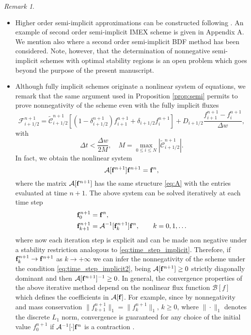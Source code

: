 \documentclass[a4paper]{article}
\theoremstyle{remark}\newtheorem{remark}{Remark}
\newcommand{\F}{\mathcal{F}}
\newcommand{\C}{\mathcal{C}}
\newcommand{\be}{\begin{equation}}
\newcommand{\ee}{\end{equation}}
\begin{document}
\begin{remark}~
\begin{itemize}
\item Higher order semi-implicit approximations can be constructed following {\rm \cite{BFR}}. An example of second order semi-implicit IMEX scheme is given in Appendix A. We mention also \cite{MB} where a second order semi-implicit BDF method has been considered. Note, however, that the determination of nonnegative semi-implicit schemes with optimal stability regions is an open problem which goes beyond the purpose of the present manuscript. 
 
\item 
Although fully implicit schemes originate a nonlinear system of equations, we remark that the same argument used in Proposition \ref{prop:semi} permits to prove nonnegativity of the scheme even with the fully implicit fluxes
\be
\F^{n+1}_{i+1/2}= \tilde{\C}_{i+1/2}^{n+1} \left[ (1-\delta_{i+1/2}^{n+1})f_{i+1}^{n+1}+\delta_{i+1/2}f_i^{n+1} \right]+D_{i+1/2}\dfrac{f_{i+1}^{n+1}-f_i^{n+1}}{\Delta w},
\ee
with 
\be
\label{eq:time_step_implicit2}
\Delta t < \dfrac{\Delta w}{2M}, \quad M = \max_{0\le i\le N}|\tilde{\C}^{n+1}_{i+1/2}|.
\ee
In fact, we obtain the nonlinear system 
\be
\mathcal{A}[{\bf f}^{n+1}]{\bf f}^{n+1}={\bf{f}}^n,
\ee
where the matrix $\mathcal A[{\bf f}^{n+1}]$ has the same structure \eqref{eq:A} with the entries evaluated at time $n+1$. The above system can  be solved iteratively at each time step
\be\begin{split}
{\bf{f}}^{n+1}_0 &= {\bf{f}}^n,\\
{\bf{f}}^{n+1}_{k+1} &= \mathcal A^{-1}[{\bf{f}}_k^{n+1}]{\bf{f}}^n, \qquad k = 0,1,\dots
\end{split}\ee
where now each iteration step is explicit and can be made non negative under a stability restriction analogous to \eqref{eq:time_step_implicit}. Therefore, if ${\bf{f}}_k^{n+1}\rightarrow {\bf{f}}^{n+1}$ as ${k\rightarrow +\infty}$ we can infer the nonnegativity of the scheme under the condition \eqref{eq:time_step_implicit2}, being $\mathcal A[{\bf{f}}^{n+1}]\ge 0$ strictly diagonally dominant and then $\mathcal A[{\bf{f}}^{n+1}]^{-1}\ge 0$. In general, the convergence properties of the above iterative method depend on the nonlinear flux function $\mathcal{B}[f]$ which defines the coefficients in $\mathcal A[{\bf{f}}]$. For example, since by nonnegativity and mass conservation $\|f_{k+1}^{n+1}\|_1=\|f_{k}^{n+1}\|_1$, $k \geq 0$, where $\|\cdot\|_1$ denotes the discrete $L_1$ norm, convergence is guaranteed for any choice of the initial value $f^{n+1}_0$ if $\mathcal A^{-1}[{\bf{\cdot}}]{\bf{f}}^n$ is a contraction \cite{CTK}.

\end{itemize}
\end{remark}
\end{document}
